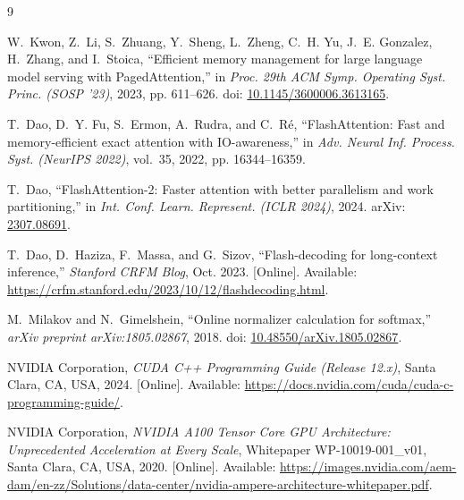 \documentclass[11pt,a4paper]{article}
\begin{document}
\begin{thebibliography}{9}

W.~Kwon, Z.~Li, S.~Zhuang, Y.~Sheng, L.~Zheng, C.~H. Yu, J.~E. Gonzalez, H.~Zhang, and I.~Stoica,
``Efficient memory management for large language model serving with {PagedAttention},''
in \emph{Proc. 29th ACM Symp. Operating Syst. Princ. (SOSP '23)}, 2023, pp. 611--626.
doi: \href{https://doi.org/10.1145/3600006.3613165}{10.1145/3600006.3613165}.

T.~Dao, D.~Y. Fu, S.~Ermon, A.~Rudra, and C.~R{\'e},
``{FlashAttention}: Fast and memory-efficient exact attention with {IO}-awareness,''
in \emph{Adv. Neural Inf. Process. Syst. (NeurIPS 2022)}, vol.~35, 2022, pp. 16344--16359.

T.~Dao,
``{FlashAttention-2}: Faster attention with better parallelism and work partitioning,''
in \emph{Int. Conf. Learn. Represent. (ICLR 2024)}, 2024.
arXiv: \href{https://arxiv.org/abs/2307.08691}{2307.08691}.

T.~Dao, D.~Haziza, F.~Massa, and G.~Sizov,
``Flash-decoding for long-context inference,''
\emph{Stanford CRFM Blog}, Oct. 2023.
[Online]. Available: \url{https://crfm.stanford.edu/2023/10/12/flashdecoding.html}.

M.~Milakov and N.~Gimelshein,
``Online normalizer calculation for softmax,''
\emph{arXiv preprint arXiv:1805.02867}, 2018.
doi: \href{https://doi.org/10.48550/arXiv.1805.02867}{10.48550/arXiv.1805.02867}.

{NVIDIA Corporation},
\emph{CUDA C++ Programming Guide (Release 12.x)},
Santa Clara, CA, USA, 2024.
[Online]. Available: \url{https://docs.nvidia.com/cuda/cuda-c-programming-guide/}.

{NVIDIA Corporation},
\emph{NVIDIA A100 Tensor Core GPU Architecture: Unprecedented Acceleration at Every Scale},
Whitepaper WP-10019-001\_v01, Santa Clara, CA, USA, 2020.
[Online]. Available: \url{https://images.nvidia.com/aem-dam/en-zz/Solutions/data-center/nvidia-ampere-architecture-whitepaper.pdf}.

\end{thebibliography}
\end{document}
